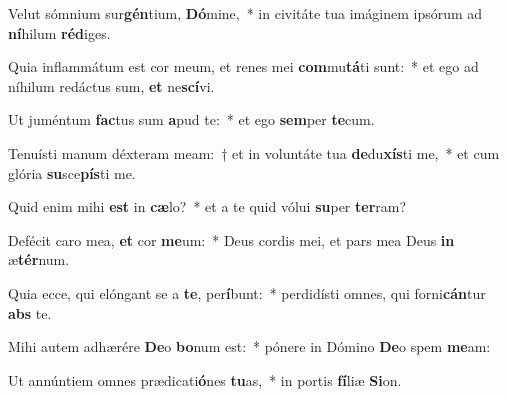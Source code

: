 \item Velut sómnium sur\textbf{gén}tium, \textbf{Dó}mine,~* in civitáte tua imáginem ipsórum ad \textbf{ní}hilum \textbf{réd}iges.
\item Quia inflammátum est cor meum, et renes mei \textbf{com}mu\textbf{tá}ti sunt:~* et ego ad níhilum redáctus sum, \textbf{et} ne\textbf{scí}vi.
\item Ut juméntum \textbf{fac}tus sum \textbf{a}pud te:~* et ego \textbf{sem}per \textbf{te}cum.
\item Tenuísti manum déxteram meam:~† et in voluntáte tua \textbf{de}du\textbf{xís}ti me,~* et cum glória \textbf{su}sce\textbf{pís}ti me.
\item Quid enim mihi \textbf{est} in \textbf{cæ}lo?~* et a te quid vólui \textbf{su}per \textbf{ter}ram?
\item Defécit caro mea, \textbf{et} cor \textbf{me}um:~* Deus cordis mei, et pars mea Deus \textbf{in} æ\textbf{tér}num.
\item Quia ecce, qui elóngant se a \textbf{te}, per\textbf{í}bunt:~* perdidísti omnes, qui forni\textbf{cán}tur \textbf{abs} te.
\item Mihi autem adhærére \textbf{De}o \textbf{bo}num est:~* pónere in Dómino \textbf{De}o spem \textbf{me}am:
\item Ut annúntiem omnes prædicati\textbf{ó}nes \textbf{tu}as,~* in portis \textbf{fí}liæ \textbf{Si}on.
